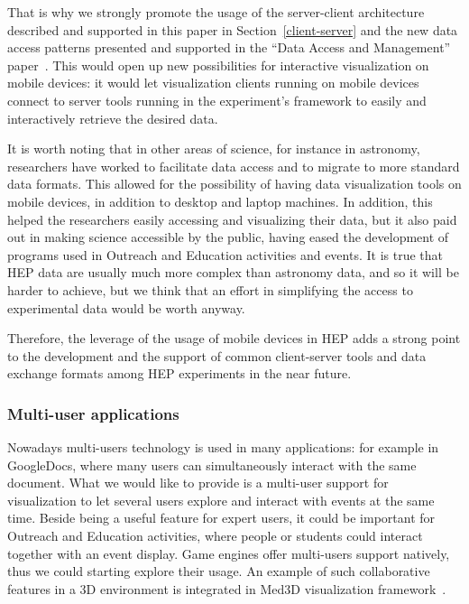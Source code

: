\documentclass[12pt,a4paper]{article}
\begin{document}
That is why we strongly promote the usage of the server-client architecture described and supported in this paper in Section~\ref{client-server}
and the new data access patterns presented and supported in the ``Data Access and Management'' paper~\cite{HSF-CWP-2017-04}. This would open
up new possibilities for interactive visualization on mobile devices: it would let visualization clients running on mobile devices
connect to server tools running in the experiment's framework to easily and interactively retrieve the desired data.

It is worth noting that in other areas of science, for instance in astronomy, researchers have worked to facilitate data
access and to migrate to more standard data formats. This allowed for the possibility of having data visualization tools
on mobile devices, in addition to desktop and laptop machines. In addition, this helped the researchers easily accessing and visualizing
their data, but it also paid out in making science accessible by the public, having eased the development of programs used in
Outreach and Education activities and events. It is true that HEP data are usually much more complex than astronomy data, and so it
will be harder to achieve, but we think that an effort in simplifying the access to experimental data would be worth anyway.

Therefore, the leverage of the usage of mobile devices in HEP adds a strong point to the development and the support of common
client-server tools and data exchange formats among HEP experiments in the near future.

\hypertarget{multi-user}{%
\subsubsection{Multi-user applications}\label{multi-user}}

Nowadays multi-users technology is used in many applications: for example in GoogleDocs, where many users can simultaneously
interact with the same document. What we would like to provide is a multi-user support for visualization to let several users
explore and interact with events at the same time. Beside being a useful feature for expert users, it could be important for
Outreach and Education activities, where people or students could interact together with an event display.
Game engines offer multi-users support natively, thus we could starting explore their usage.
An example of such collaborative features in a 3D environment is integrated in Med3D visualization framework~\cite{Bohak2017}.
\end{document}
